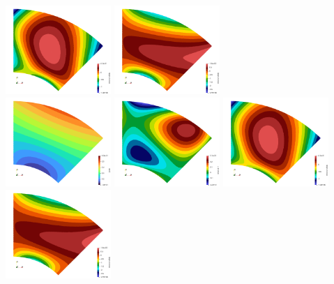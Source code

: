 \begin{center}
\includegraphics[width=4cm]{images/mappings/biquadratic3/elt4/dfdx.0001.png}
\includegraphics[width=4cm]{images/mappings/biquadratic3/elt4/dfdy.0001.png}\\
\includegraphics[width=4cm]{images/mappings/biquadratic3/elt4/jcob.0002.png}
\includegraphics[width=4cm]{images/mappings/biquadratic3/elt4/f.0002.png}
\includegraphics[width=4cm]{images/mappings/biquadratic3/elt4/dfdx.0002.png}
\includegraphics[width=4cm]{images/mappings/biquadratic3/elt4/dfdy.0002.png}\\

\end{center}
